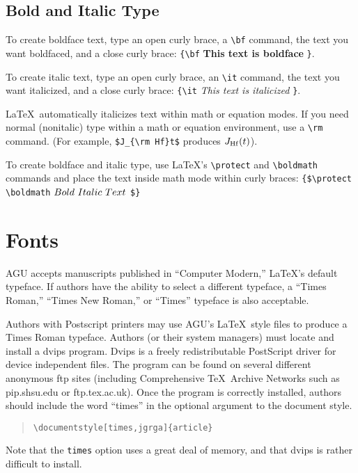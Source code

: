 \begin{article}
\subsection{Bold and Italic Type}

To create boldface text, type an open curly brace,
a \verb"\bf" command, the text you want boldfaced, and
a close curly brace:  \verb"{\bf" {\bf This text is 
boldface} \verb"}".

To create italic text, type an open curly brace,
an \verb"\it" command, the text you want italicized, and
a close curly brace:  \verb"{\it" {\it This text is 
italicized} \verb"}".

\LaTeX\ automatically italicizes text within math or equation 
modes.  If you need normal (nonitalic) type within a math or
equation environment, use a \verb"\rm" command.  (For example, 
\verb"$J_{\rm Hf}t$" produces $J_{\rm Hf}(t)$).

To create boldface and italic type, use \LaTeX's 
\verb"\protect" and \verb"\boldmath" commands and place
the text inside math mode within curly braces: \linebreak 
\verb"{$\protect \boldmath" 
{$\protect \boldmath Bold\ Italic\ Text $} \verb"$}"


\section{Fonts}
AGU accepts manuscripts published in ``Computer Modern,'' 
\LaTeX's default typeface.  If authors have the ability
to select a different typeface, a ``Times Roman,'' ``Times
New Roman,'' or ``Times'' typeface is also acceptable.

Authors with Postscript printers may use AGU's \LaTeX\ 
style files to produce a Times Roman typeface.  Authors 
(or their system managers) must locate and install a dvips 
program.  Dvips is a freely redistributable PostScript 
driver for device independent files.  The program can 
be found on several different anonymous ftp sites
(including Comprehensive \TeX\ Archive Networks such as 
pip.shsu.edu or ftp.tex.ac.uk).  Once the program is 
correctly installed, authors should include the word 
``times'' in the optional argument to the document
style.
\begin{center}
\begin{quote}
\verb"\documentstyle[times,jgrga]{article}"
\end{quote}
\end{center}
Note that the {\tt times} option uses a great deal of 
memory, and that dvips is rather difficult to install.



\end{article}
